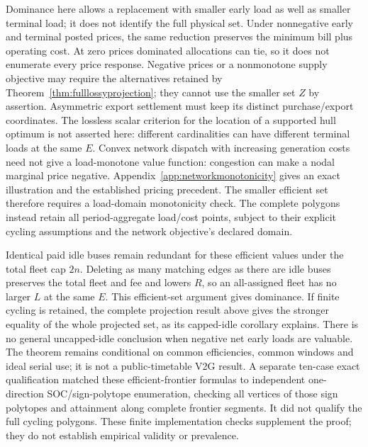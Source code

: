 Dominance here allows a replacement with smaller early load as well as
smaller terminal load; it does not identify the full physical set.
Under nonnegative early and terminal posted prices, the same reduction
preserves the minimum bill plus operating cost. At zero prices dominated
allocations can tie, so it does not enumerate every price response.
Negative prices or a nonmonotone supply objective may require the alternatives
retained by Theorem~\ref{thm:fulllossyprojection}; they cannot use the smaller
set $Z$ by assertion. Asymmetric export settlement must keep its distinct
purchase/export coordinates. The lossless scalar criterion
for the location of a supported hull optimum is not asserted here:
different cardinalities can have different terminal loads at the same $E$.
Convex network dispatch with increasing generation costs need not give a
load-monotone value function: congestion can make a nodal marginal price
negative. Appendix~\ref{app:networkmonotonicity} gives an exact illustration
and the established pricing precedent. The smaller efficient set therefore
requires a load-domain monotonicity check. The complete polygons instead
retain all period-aggregate load/cost points, subject to their explicit
cycling assumptions and the network objective's declared domain.

Identical paid idle buses remain redundant for these efficient values
under the total fleet cap $2n$. Deleting as many matching edges as there
are idle buses preserves the total fleet and fee and lowers $R$, so an
all-assigned fleet has no larger $L$ at the same $E$. This efficient-set
argument gives dominance. If finite cycling is retained, the complete
projection result above gives the stronger equality of the whole projected
set, as its capped-idle corollary explains.
There is no general uncapped-idle conclusion when negative net early loads
are valuable. The theorem remains conditional on common efficiencies,
common windows and ideal serial use; it is not a public-timetable V2G
result. A separate ten-case exact qualification matched these efficient-frontier
formulas to independent one-direction SOC/sign-polytope enumeration, checking
all vertices of those sign polytopes and attainment along complete frontier
segments. It did not qualify the full cycling polygons. These finite
implementation checks supplement the proof; they do not establish
empirical validity or prevalence.

